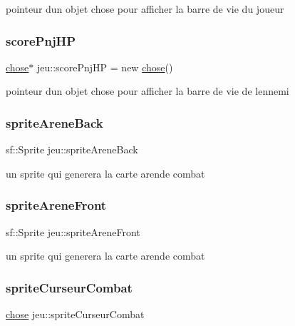 pointeur d\textquotesingle{}un objet chose pour afficher la barre de vie du joueur \mbox{\label{classjeu_abc8d0cfa5849ba7e4159fcf5fbe7e91a}} 
\subsubsection{\texorpdfstring{score\+Pnj\+HP}{scorePnjHP}}
{\footnotesize\ttfamily \mbox{\hyperlink{classchose}{chose}}$\ast$ jeu\+::score\+Pnj\+HP = new \mbox{\hyperlink{classchose}{chose}}()}

pointeur d\textquotesingle{}un objet chose pour afficher la barre de vie de l\textquotesingle{}ennemi \mbox{\label{classjeu_a0c9e3f7c5f2f0cf31bd5da9e3916fcb0}} 
\subsubsection{\texorpdfstring{sprite\+Arene\+Back}{spriteAreneBack}}
{\footnotesize\ttfamily sf\+::\+Sprite jeu\+::sprite\+Arene\+Back}

un sprite qui generera la carte arende combat \mbox{\label{classjeu_aff95549a72e18bea919e76c1c80032cb}} 
\subsubsection{\texorpdfstring{sprite\+Arene\+Front}{spriteAreneFront}}
{\footnotesize\ttfamily sf\+::\+Sprite jeu\+::sprite\+Arene\+Front}

un sprite qui generera la carte arende combat \mbox{\label{classjeu_ae0756dafcae0740b3992d631e38888df}} 
\subsubsection{\texorpdfstring{sprite\+Curseur\+Combat}{spriteCurseurCombat}}
{\footnotesize\ttfamily \mbox{\hyperlink{classchose}{chose}} jeu\+::sprite\+Curseur\+Combat}

